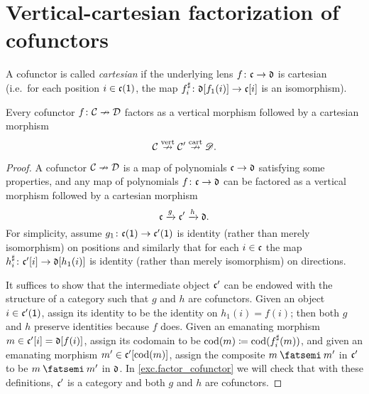 \documentclass[Book-Poly]{subfiles}
\begin{document}

\section{Vertical-cartesian factorization of cofunctors}

A cofunctor is called \emph{cartesian} if the underlying lens $f\colon\mathfrak{c}\to\mathfrak{d}$ is cartesian (i.e.\ for each position $i\in\mathfrak{c}(\textsf{1})$, the map $f^\sharp_i\colon\mathfrak{d}[f_1(i)]\to\mathfrak{c}[i]$ is an isomorphism). %

\begin{proposition}\label{prop.factor_cofunctor}
Every cofunctor $f\colon\mathcal{C}\nrightarrow\mathcal{D}$ factors as a vertical morphism followed by a cartesian morphism
\[
\mathcal{C}\overset{\text{vert}}{\nrightarrow}\mathcal{C}'\overset{\text{cart}}{\nrightarrow}\mathscr{D}.
\]
\end{proposition}
\begin{proof}
A cofunctor $\mathcal{C}\nrightarrow\mathcal{D}$ is a map of polynomials $\mathfrak{c}\to\mathfrak{d}$ satisfying some properties, and any map of polynomials $f\colon\mathfrak{c}\to\mathfrak{d}$ can be factored as a vertical morphism followed by a cartesian morphism
\[
	\mathfrak{c}\xrightarrow{g}\mathfrak{c'}\xrightarrow{h}\mathfrak{d}.
\]
For simplicity, assume $g_1\colon\mathfrak{c}(\textsf{1})\to\mathfrak{c'}(\textsf{1})$ is identity (rather than merely isomorphism) on positions and similarly that for each $i\in\mathfrak{c}$ the map $h^\sharp_i\colon\mathfrak{c'}[i]\to\mathfrak{d}[h_1(i)]$ is identity (rather than merely isomorphism) on directions. 

It suffices to show that the intermediate object $\mathfrak{c'}$ can be endowed with the structure of a category such that $g$ and $h$ are cofunctors. Given an object $i\in\mathfrak{c'}(\textsf{1})$, assign its identity to be the identity on $h_1(i)=f(i)$; then both $g$ and $h$ preserve identities because $f$ does. Given an emanating morphism $m\in\mathfrak{c'}[i]=\mathfrak{d}[f(i)]$, assign its codomain to be $\operatorname{cod}(m)\coloneqq\operatorname{cod}(f^\sharp_i(m))$, and given an emanating morphism $m'\in\mathfrak{c'}[\operatorname{cod}(m)]$, assign the composite $m\then m'$ in $\mathfrak{c'}$ to be $m\then m'$ in $\mathfrak{d}$. In \cref{exc.factor_cofunctor} we will check that with these definitions, $\mathfrak{c'}$ is a category and both $g$ and $h$ are cofunctors.
\end{proof}
\end{document}
